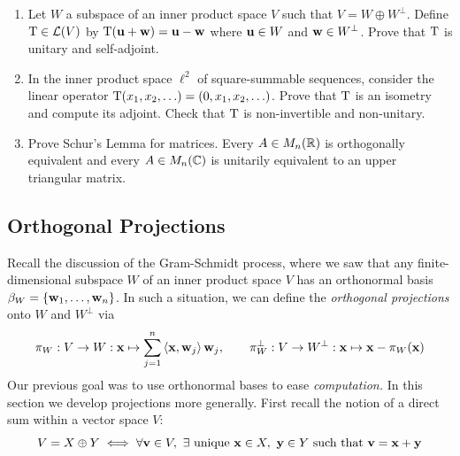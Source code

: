 \begin{exercises}
\begin{enumerate}
		
		\item Let $W$ a subspace of an inner product space $V$ such that $V=W\oplus W^\perp$. Define $\mathrm{T}\in\mathcal{L}(V)$ by $\mathrm{T}({\mathbf{u}}+{\mathbf{w}})={\mathbf{u}}-{\mathbf{w}}$ where ${\mathbf{u}}\in W$ and ${\mathbf{w}}\in W^\perp$. Prove that $\mathrm{T}$ is unitary and self-adjoint.
		
		
		\item\label{ex:isometrynotunitary} In the inner product space $\ell^2$ of square-summable sequences, consider the linear operator
		$\mathrm{T}(x_1,x_2,\ldots)=(0,x_1,x_2,\ldots)$. Prove that $\mathrm{T}$ is an isometry and compute its adjoint. Check that $\mathrm{T}$ is non-invertible and non-unitary.
		
		
		\item Prove Schur's Lemma for matrices. Every $A\in M_n(\mathbb{R})$ is orthogonally equivalent and every $A\in M_n(\mathbb{C})$ is unitarily equivalent to an upper triangular matrix. 
	\end{enumerate}
\end{exercises}


\clearpage



\subsection{Orthogonal Projections}

Recall the discussion of the Gram-Schmidt process, where we saw that any finite-dimensional subspace $W$ of an inner product space $V$ has an orthonormal basis $\beta_W=\{{\mathbf{{\mathbf{w}}}}_1,\ldots,{\mathbf{{\mathbf{w}}}}_{n}\}$. In such a situation, we can define the \emph{orthogonal projections} onto $W$ and $W^\perp$ via
\[
	\pi_W:V\to W:{\mathbf{x}}\mapsto \sum_{j=1}^n\left\langle {\mathbf{x}},{\mathbf{w}}_j\right\rangle{\mathbf{w}}_j,\qquad 
	\pi_W^\perp:V\to W^\perp:{\mathbf{x}}\mapsto {\mathbf{x}}-\pi_W({\mathbf{x}})
\]
Our previous goal was to use orthonormal bases to ease \emph{computation.} In this section we develop projections more generally. First recall the notion of a direct sum within a vector space $V$:
\[
	V=X\oplus Y 
	\iff \forall {\mathbf{v}}\in V,\ \exists \text{ unique }{\mathbf{x}}\in X,\ {\mathbf{y}}\in Y
	\text{ such that }{\mathbf{v}}={\mathbf{x}}+{\mathbf{y}}
\]


